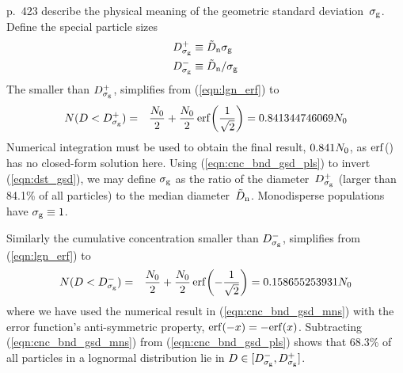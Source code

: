\documentclass[12pt,twoside]{article}
\begin{document}
\cite{SeP97} p.~423 describe the physical meaning of the geometric
standard deviation~$\sigma_{\mathrm{g}}$.
Define the special particle sizes
\begin{subequations} %
\label{eqn:dst_gsd}
\begin{align} 
D_{\sigma_{\mathrm{g}}}^{+} &\equiv \tilde{D}_{\mathrm{n}} \sigma_{\mathrm{g}} \\
D_{\sigma_{\mathrm{g}}}^{-} &\equiv \tilde{D}_{\mathrm{n}} / \sigma_{\mathrm{g}}
\end{align} 
\end{subequations} %
The  smaller than $D_{\sigma_{\mathrm{g}}}^{+}$,
simplifies from (\ref{eqn:lgn_erf}) to 
\begin{eqnarray}
N(D < D_{\sigma_{\mathrm{g}}}^{+})
& = & \frac{N_{0}}{2} + 
\frac{N_{0}}{2} \, \mathrm{erf}\! \left( \frac{1}{\sqrt{2}} \right)
= 0.841344746069 N_{0}
\label{eqn:cnc_bnd_gsd_pls}
\end{eqnarray}
Numerical integration must be used to obtain the final result, 
$0.841 N_{0}$, as $\mathrm{erf}$() has no closed-form solution here.
Using (\ref{eqn:cnc_bnd_gsd_pls}) to invert (\ref{eqn:dst_gsd}), 
we may define $\sigma_{\mathrm{g}}$ as the ratio of the diameter~$D_{\sigma_{\mathrm{g}}}^{+}$ (larger
than 84.1\% of all particles) to the median diameter~$\tilde{D}_{\mathrm{n}}$.
Monodisperse populations have $\sigma_{\mathrm{g}} \equiv 1$.

Similarly the cumulative concentration smaller than $D_{\sigma_{\mathrm{g}}}^{-}$,
simplifies from (\ref{eqn:lgn_erf}) to 
\begin{eqnarray}
N(D < D_{\sigma_{\mathrm{g}}}^{-})
& = & \frac{N_{0}}{2} + 
\frac{N_{0}}{2} \, \mathrm{erf}\! \left(- \frac{1}{\sqrt{2}} \right)
= 0.158655253931 N_{0}
\label{eqn:cnc_bnd_gsd_mns}
\end{eqnarray}
where we have used the numerical result in (\ref{eqn:cnc_bnd_gsd_mns})
with the error function's anti-symmetric property,
$\mathrm{erf}(-x) = -\mathrm{erf}(x)$.
Subtracting (\ref{eqn:cnc_bnd_gsd_mns}) from (\ref{eqn:cnc_bnd_gsd_pls})
shows that 68.3\% of all particles in a lognormal distribution lie in 
$D \in [D_{\sigma_{\mathrm{g}}}^{-},D_{\sigma_{\mathrm{g}}}^{+}]$. 
\end{document}
